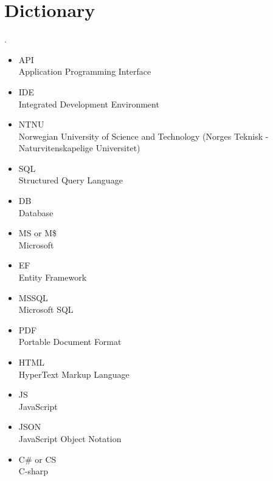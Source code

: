 \section{Dictionary}.
\begin{itemize}
\item API \\ Application Programming Interface
\item IDE \\ Integrated Development Environment
\item NTNU \\ Norwegian University of Science and Technology (Norges Teknisk - Naturvitenskapelige Universitet)
\item SQL \\ Structured Query Language 
\item DB \\ Database 
\item MS or M\$ \\ Microsoft
\item EF \\ Entity Framework
\item MSSQL \\ Microsoft SQL
\item PDF \\ Portable Document Format
\item HTML \\ HyperText Markup Language
\item JS \\ JavaScript
\item JSON \\ JavaScript Object Notation
\item C\# or CS\\ C-sharp

\end{itemize}




